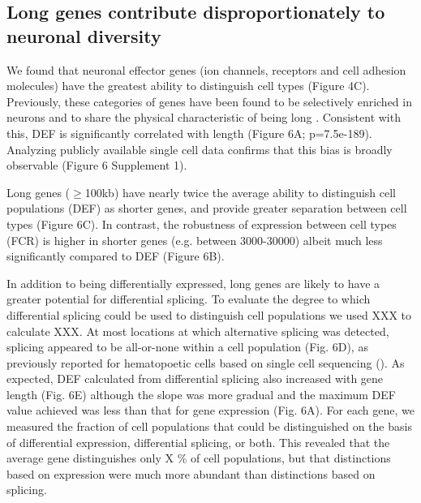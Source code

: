 \subsection{Long genes contribute disproportionately to neuronal diversity}

We found that neuronal effector genes (ion channels, receptors and cell adhesion molecules) have the greatest ability to distinguish cell types (Figure 4C). Previously, these categories of genes have been found to be selectively enriched in neurons and to share the physical characteristic of being long \citep{Sugino_2014,Gabel_2015,Zylka_2015}. Consistent with this, DEF is significantly correlated with length (Figure 6A; p=7.5e-189). Analyzing publicly available single cell data confirms that this bias is broadly observable (Figure 6 Supplement 1). 

Long genes ($\geq$100kb) have nearly twice the average ability to distinguish cell populations (DEF) as shorter genes, and provide greater separation between cell types (Figure 6C). In contrast, the robustness of expression between cell types (FCR) is higher in shorter genes (e.g. between 3000-30000) albeit much less significantly compared to DEF (Figure 6B). 

In addition to being differentially expressed, long genes are likely to have a greater potential for differential splicing. To evaluate the degree to which differential splicing could be used to distinguish cell populations we used XXX to calculate XXX. At most locations at which alternative splicing was detected, splicing appeared to be all-or-none within a cell population (Fig. 6D), as previously reported for hematopoetic cells based on single cell sequencing (). As expected, DEF calculated from differential splicing also increased with gene length (Fig. 6E) although the slope was more gradual and the maximum DEF value achieved was less than that for gene expression (Fig. 6A). For each gene, we measured the fraction of cell populations that could be distinguished on the basis of differential expression, differential splicing, or both. This revealed that the average gene distinguishes only X \% of cell populations, but that distinctions based on expression were much more abundant than distinctions based on splicing.  

